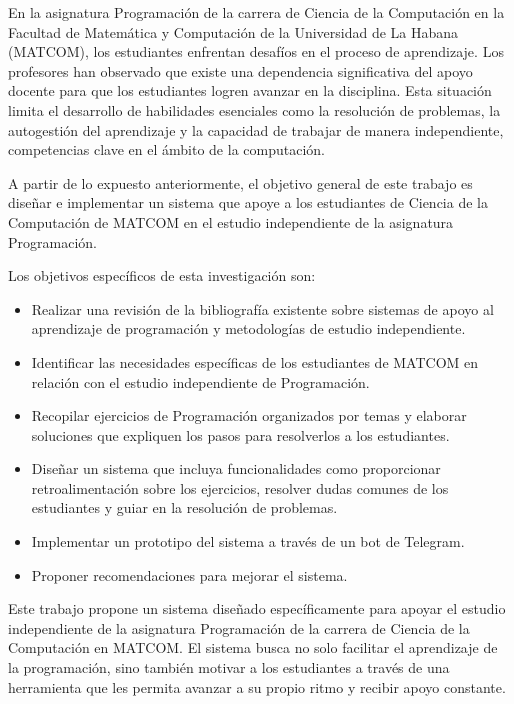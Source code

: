 En la asignatura Programación de la carrera de Ciencia de la Computación en la Facultad de Matemática y Computación de la Universidad de La Habana (\mbox{MATCOM}), los estudiantes enfrentan desafíos en el proceso de aprendizaje. Los profesores han observado que existe una dependencia significativa del apoyo docente para que los estudiantes logren avanzar en la disciplina. Esta situación limita el desarrollo de habilidades esenciales como la resolución de problemas, la autogestión del aprendizaje y la capacidad de trabajar de manera independiente, competencias clave en el ámbito de la computación.

A partir de lo expuesto anteriormente, el objetivo general de este trabajo es diseñar e implementar un sistema que apoye a los estudiantes de Ciencia de la Computación de \mbox{MATCOM} en el estudio independiente de la asignatura Programación.

Los objetivos específicos de esta investigación son:
\begin{itemize}
    \item Realizar una revisión de la bibliografía existente sobre sistemas de apoyo al aprendizaje de programación y metodologías de estudio independiente.
    \item Identificar las necesidades específicas de los estudiantes de \mbox{MATCOM} en relación con el estudio independiente de Programación.
    \item Recopilar ejercicios de Programación organizados por temas y elaborar soluciones que expliquen los pasos para resolverlos a los estudiantes.
    \item Diseñar un sistema que incluya funcionalidades como proporcionar retroalimentación sobre los ejercicios, resolver dudas comunes de los estudiantes y guiar en la resolución de problemas.
    \item Implementar un prototipo del sistema a través de un bot de Telegram.
    \item Proponer recomendaciones para mejorar el sistema.
\end{itemize}

Este trabajo propone un sistema diseñado específicamente para apoyar el estudio independiente de la asignatura Programación de la carrera de Ciencia de la Computación en \mbox{MATCOM}. El sistema busca no solo facilitar el aprendizaje de la programación, sino también motivar a los estudiantes a través de una herramienta que les permita avanzar a su propio ritmo y recibir apoyo constante.

